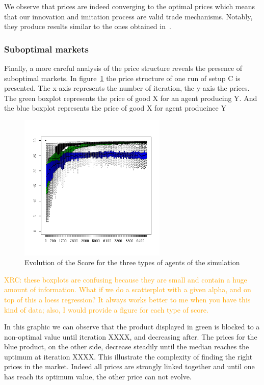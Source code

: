\documentclass{wscpaperproc}
\newcommand{\memo}[2]{\textcolor{#1}{#2}}
\newcommand{\xrc}[1]{\memo{orange}{XRC: #1\\}}
\begin{document}
We observe that prices are indeed converging to the optimal prices which means that our innovation and imitation process are valid trade mechanisms. Notably, they produce results similar to the ones obtained in~\cite{gintis_emergence_2006}.

\subsubsection{Suboptimal markets}

Finally, a more careful analysis of the price structure reveals the presence of suboptimal markets. In figure~\ref{fig:suboptimal} the price structure of one run of setup C is presented. The x-axis represents the number of iteration, the y-axis the prices. The green boxplot represents the price of good X for an agent producing Y. And the blue boxplot represents the price of good X for agent producince Y 

\begin{figure}[htp]
	\begin{center}
		\includegraphics[width=7cm]{img/suboptimal.png}
	\end{center}
	\caption{Evolution of the Score for the three types of agents of the simulation}
	\label{fig:suboptimal}
\end{figure}

\xrc{these boxplots are confusing because they are small and contain a huge amount of information. What if we do a scatterplot with a given alpha, and on top of this a loess regression? It always works better to me when you have this kind of data; also, I would provide a figure for each type of score.}

In this graphic we can observe that the product displayed in green is blocked to a non-optimal value until iteration XXXX, and decreasing after. The prices for the blue product, on the other side, decrease steadily until the median reaches the uptimum at iteration XXXX. This illustrate the complexity of finding the right prices in the market. Indeed all prices are strongly linked together and until one has reach its optimum value, the other price can not evolve. 
\end{document}
